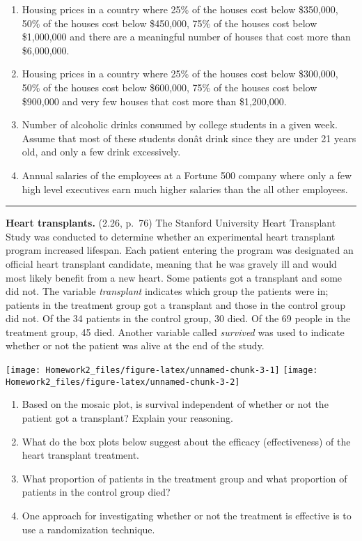 \documentclass[]{article}
\providecommand{\tightlist}{%
  \setlength{\itemsep}{0pt}\setlength{\parskip}{0pt}}
\begin{document}
\begin{enumerate}
\def\labelenumi{(\alph{enumi})}
\tightlist
\item
  Housing prices in a country where 25\% of the houses cost below
  \$350,000, 50\% of the houses cost below \$450,000, 75\% of the houses
  cost below \$1,000,000 and there are a meaningful number of houses
  that cost more than \$6,000,000.
\item
  Housing prices in a country where 25\% of the houses cost below
  \$300,000, 50\% of the houses cost below \$600,000, 75\% of the houses
  cost below \$900,000 and very few houses that cost more than
  \$1,200,000.
\item
  Number of alcoholic drinks consumed by college students in a given
  week. Assume that most of these students donât drink since they are
  under 21 years old, and only a few drink excessively.
\item
  Annual salaries of the employees at a Fortune 500 company where only a
  few high level executives earn much higher salaries than the all other
  employees.
\end{enumerate}

\begin{center}\rule{0.5\linewidth}{\linethickness}\end{center}

\clearpage

\textbf{Heart transplants.} (2.26, p.~76) The Stanford University Heart
Transplant Study was conducted to determine whether an experimental
heart transplant program increased lifespan. Each patient entering the
program was designated an official heart transplant candidate, meaning
that he was gravely ill and would most likely benefit from a new heart.
Some patients got a transplant and some did not. The variable
\emph{transplant} indicates which group the patients were in; patients
in the treatment group got a transplant and those in the control group
did not. Of the 34 patients in the control group, 30 died. Of the 69
people in the treatment group, 45 died. Another variable called
\emph{survived} was used to indicate whether or not the patient was
alive at the end of the study.

\texttt{[image: Homework2\_files/figure-latex/unnamed-chunk-3-1]}
\texttt{[image: Homework2\_files/figure-latex/unnamed-chunk-3-2]}

\begin{enumerate}
\def\labelenumi{(\alph{enumi})}
\tightlist
\item
  Based on the mosaic plot, is survival independent of whether or not
  the patient got a transplant? Explain your reasoning.
\item
  What do the box plots below suggest about the efficacy (effectiveness)
  of the heart transplant treatment.
\item
  What proportion of patients in the treatment group and what proportion
  of patients in the control group died?
\item
  One approach for investigating whether or not the treatment is
  effective is to use a randomization technique.
\end{enumerate}
\end{document}
